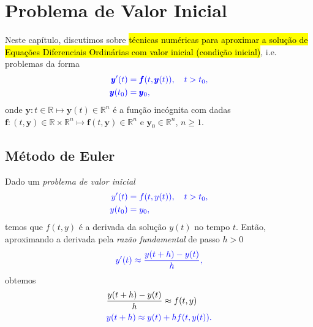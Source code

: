 
\chapter{Problema de Valor Inicial}\label{cap_pvi}
\thispagestyle{fancy}

Neste capítulo, discutimos sobre \hl{técnicas numéricas para aproximar a solução de Equações Diferenciais Ordinárias com valor inicial (condição inicial)}, i.e. problemas da forma
\begin{subequations}\hleq
  \begin{align}
    \pmb{y}'(t) &= \pmb{f}(t,\pmb{y}(t)),\quad t>t_0,\\
    \pmb{y}(t_0) &= \pmb{y}_0,
  \end{align}
\end{subequations}
onde $\pmb{y}:t\in\mathbb{R}\mapsto\pmb{y}(t)\in\mathbb{R}^n$ é a função incógnita com dadas $\pmb{f}:(t,\pmb{y})\in\mathbb{R}\times\mathbb{R}^n\mapsto\pmb{f}(t,\pmb{y})\in\mathbb{R}^n$ e $\pmb{y}_0\in\mathbb{R}^n$, $n\geq 1$.

\section{Método de Euler}\label{cap_pvi_sec_euler}

Dado um \emph{problema de valor inicial}
\begin{subequations}\label{cap_pvi_sec_euler:eq:pvi}\hleq
  \begin{align}
    y'(t) &= f(t,y(t)),\quad t>t_0,\\
    y(t_0) &= y_0,
  \end{align}
\end{subequations}
temos que $f(t,y)$ é a derivada da solução $y(t)$ no tempo $t$. Então, aproximando a derivada pela \emph{razão fundamental} de passo $h>0$
\begin{equation}\color{blue}y'(t) \approx \frac{y(t+h)-y(t)}{h},
\end{equation}
obtemos
\begin{align}
  &\frac{y(t+h)-y(t)}{h} \approx f(t,y) \\
  &\color{blue}y(t+h) \approx y(t) + hf(t,y(t)).\label{cap_pvi_sec_euler:eq:euler_aux1}
\end{align}

